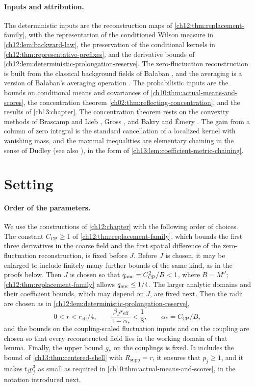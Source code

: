 \paragraph{Inputs and attribution.}
The deterministic inputs are the reconstruction maps of \cref{ch12:thm:replacement-family}, with the representation of the conditioned Wilson measure in \cref{ch12:lem:backward-law}, the preservation of the conditional kernels in \cref{ch12:thm:representative-prefixes}, and the derivative bounds of \cref{ch12:lem:deterministic-prolongation-reserve}. The zero-fluctuation reconstruction is built from the classical background fields of Ba{\l}aban \cite{Balaban1985Variational}, and the averaging is a version of Ba{\l}aban's averaging operation \cite{Balaban1985Averaging}. The probabilistic inputs are the bounds on conditional means and covariances of \cref{ch10:thm:actual-means-and-scores}, the concentration theorem \cref{ch02:thm:reflecting-concentration}, and the results of \cref{ch13:chapter}. The concentration theorem rests on the convexity methods of Brascamp and Lieb \cite{BrascampLieb1976}, Gross \cite{Gross1975}, and Bakry and \'Emery \cite{BakryEmery1985}. The gain from a column of zero integral is the standard cancellation of a localized kernel with vanishing mass, and the maximal inequalities are elementary chaining in the sense of Dudley \cite{Dudley1967} (see also \cite{Dirksen2015}), in the form of \cref{ch13:lem:coefficient-metric-chaining}.

\section{Setting}\label{ch14:sec:setting}

\paragraph{Order of the parameters.}
We use the constructions of \cref{ch12:chapter} with the following order of choices. The constant $C_{\mathrm{CP}}\ge1$ of \cref{ch12:thm:replacement-family}, which bounds the first three derivatives in the coarse field and the first spatial difference of the zero-fluctuation reconstruction, is fixed before $J$. Before $J$ is chosen, it may be enlarged to include finitely many further bounds of the same kind, as in the proofs below. Then $J$ is chosen so that $q_{\mathrm{anc}}=C_{\mathrm{CP}}^2/B<1$, where $B=M^J$; \cref{ch12:thm:replacement-family} allows $q_{\mathrm{anc}}\le1/4$. The larger analytic domains and their coefficient bounds, which may depend on $J$, are fixed next. Then the radii are chosen as in \cref{ch12:lem:deterministic-prolongation-reserve},
\[
 0<r<r_{\mathrm{eff}}/4,\qquad\frac{\beta_Jr_{\mathrm{eff}}}{1-\alpha_*}<\frac18,\qquad\alpha_*=C_{\mathrm{CP}}/B,
\]
and the bounds on the coupling-scaled fluctuation inputs and on the coupling are chosen so that every reconstructed field lies in the working domain of that lemma. Finally, the upper bound $g_*$ on the couplings is fixed. It includes the bound of \cref{ch13:thm:centered-shell} with $R_{\mathrm{supp}}=r$, it ensures that $p_j\ge1$, and it makes $t_jp_j^3$ as small as required in \cref{ch10:thm:actual-means-and-scores}, in the notation introduced next.

